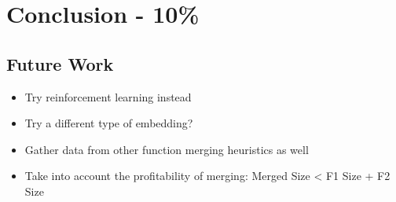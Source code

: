 \chapter{Conclusion - 10\%}


\section{Future Work}

\begin{itemize}
    \item Try reinforcement learning instead
    \item Try a different type of embedding?
    \item Gather data from other function merging heuristics as well
    \item Take into account the profitability of merging: Merged Size < F1 Size + F2 Size
\end{itemize}